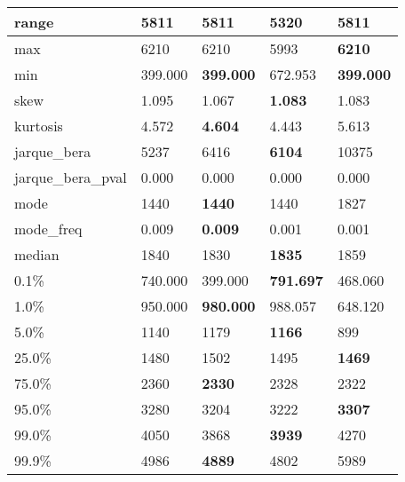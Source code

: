 \begin{table}[H]
\begin{tabular}{|l|m{10em}|m{10em}|m{10em}|m{10em}|}
\hline range & 5811 & 5811 & \cellcolor[rgb]{0.9, 0.54, 0.52} 5320 & \bfseries 5811 \\
\hline max & 6210 & 6210 & \cellcolor[rgb]{0.9, 0.54, 0.52} 5993 & \bfseries 6210 \\
\hline min & 399.000 & \bfseries 399.000 & \cellcolor[rgb]{0.9, 0.54, 0.52} 672.953 & \bfseries 399.000 \\
\hline skew & 1.095 & \cellcolor[rgb]{0.9, 0.54, 0.52} 1.067 & \bfseries 1.083 & 1.083 \\
\hline kurtosis & 4.572 & \bfseries 4.604 & 4.443 & \cellcolor[rgb]{0.9, 0.54, 0.52} 5.613 \\
\hline jarque\_bera & 5237 & 6416 & \bfseries 6104 & \cellcolor[rgb]{0.9, 0.54, 0.52} 10375 \\
\hline jarque\_bera\_pval & 0.000 & 0.000 & 0.000 & 0.000 \\
\hline mode & 1440 & \bfseries 1440 & 1440 & \cellcolor[rgb]{0.9, 0.54, 0.52} 1827 \\
\hline mode\_freq & 0.009 & \bfseries 0.009 & \cellcolor[rgb]{0.9, 0.54, 0.52} 0.001 & 0.001 \\
\hline median & 1840 & 1830 & \bfseries 1835 & \cellcolor[rgb]{0.9, 0.54, 0.52} 1859 \\
\hline 0.1\% & 740.000 & \cellcolor[rgb]{0.9, 0.54, 0.52} 399.000 & \bfseries 791.697 & 468.060 \\
\hline 1.0\% & 950.000 & \bfseries 980.000 & 988.057 & \cellcolor[rgb]{0.9, 0.54, 0.52} 648.120 \\
\hline 5.0\% & 1140 & 1179 & \bfseries 1166 & \cellcolor[rgb]{0.9, 0.54, 0.52} 899 \\
\hline 25.0\% & 1480 & \cellcolor[rgb]{0.9, 0.54, 0.52} 1502 & 1495 & \bfseries 1469 \\
\hline 75.0\% & 2360 & \bfseries 2330 & 2328 & \cellcolor[rgb]{0.9, 0.54, 0.52} 2322 \\
\hline 95.0\% & 3280 & \cellcolor[rgb]{0.9, 0.54, 0.52} 3204 & 3222 & \bfseries 3307 \\
\hline 99.0\% & 4050 & 3868 & \bfseries 3939 & \cellcolor[rgb]{0.9, 0.54, 0.52} 4270 \\
\hline 99.9\% & 4986 & \bfseries 4889 & 4802 & \cellcolor[rgb]{0.9, 0.54, 0.52} 5989 \\
\hline
\end{tabular}
\end{table}

